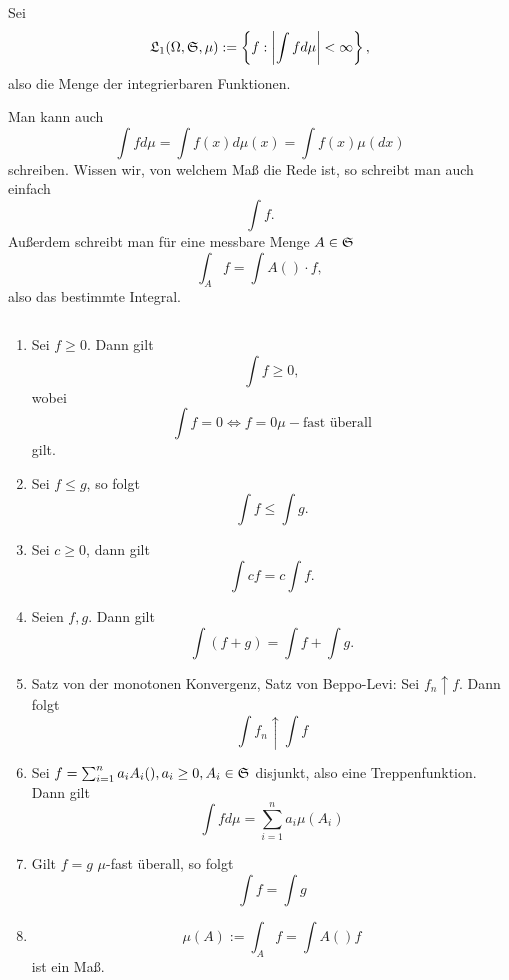 			\begin{defi}
				Sei 
				\[ \mathfrak{L}_1(\Omega,\mathfrak{S}, \mu):=\left\{f: \left|\int fd\mu\right|<\infty\right\}, \]
				also die Menge der integrierbaren Funktionen. 
			\end{defi}
			
			\begin{bem}[Notation]
				Man kann auch 
				\[ \int fd\mu=\int f(x) d\mu(x)=\int f(x)\mu(dx) \]
				schreiben. Wissen wir, von welchem Maß die Rede ist, so schreibt man auch einfach
				\[ \int f. \]
				Außerdem schreibt man für eine messbare Menge $A\in\mathfrak{S}$
				\[ \int_A f=\int A()\cdot f, \]
				also das bestimmte Integral. 
			\end{bem}
			
			\begin{satz}
				$  $
				\begin{enumerate}[(1)]
					\item Sei $f\ge 0$. Dann gilt
					\[ \int f\ge 0, \]
					wobei
					\[ \int f=0\Leftrightarrow f=0 \mu-\text{fast überall} \]
					gilt. 
					\item Sei $f\le g$, so folgt
					\[ \int f\le \int g. \]
					\item Sei $c\ge 0$, dann gilt
					\[ \int cf=c\int f. \]
					\item Seien $f,g$. Dann gilt
					\[ \int (f+g)=\int f+\int g. \] 
					\item Satz von der monotonen Konvergenz, Satz von Beppo-Levi:\newline
					 Sei $f_n\uparrow f$. Dann folgt
					\[ \int f_n\uparrow \int f \]
					\item Sei $f=\sum_{i=1}^n a_i A_i(),a_i\ge 0, A_i\in\mathfrak{S}$ disjunkt, also eine Treppenfunktion. Dann gilt
					\[ \int fd\mu=\sum_{i=1}^n a_i\mu(A_i) \]
					\item Gilt $f=g$ $\mu$-fast überall, so folgt
					\[ \int f=\int g \]
					\item 
					\[ \mu(A):=\int_A f=\int A() f \]
					ist ein Maß. 
				\end{enumerate}
			\end{satz}
			
